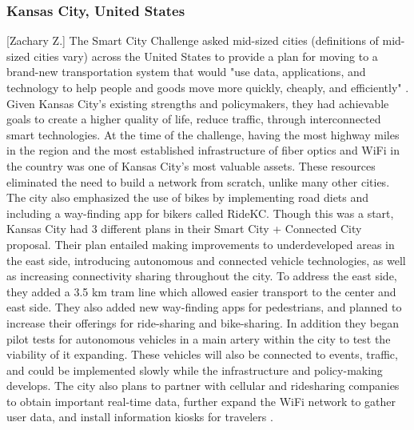 \documentclass[12pt]{article}                               %
\begin{document}
\subsubsection{Kansas City, United States}[Zachary Z.]
The Smart City Challenge asked mid-sized cities (definitions of mid-sized cities vary) across the United States to provide a plan for moving to a brand-new transportation system that would "use data, applications, and technology to help people and goods move more quickly, cheaply, and efficiently" \cite{CityofDenver2016}. Given Kansas City's existing strengths and policymakers, they had achievable goals to create a higher quality of life, reduce traffic, through interconnected smart technologies. At the time of the challenge, having the most highway miles in the region and the most established infrastructure of fiber optics and WiFi in the country was one of Kansas City's most valuable assets. These resources eliminated the need to build a network from scratch, unlike many other cities. The city also emphasized the use of bikes by implementing road diets and including a way-finding app for bikers called RideKC. Though this was a start, Kansas City had 3 different plans in their Smart City + Connected City proposal. Their plan entailed making improvements to underdeveloped areas in the east side, introducing autonomous and connected vehicle technologies, as well as increasing connectivity sharing throughout the city. To address the east side, they added a 3.5 km tram line which allowed easier transport to the center and east side. They also added new way-finding apps for pedestrians, and planned to increase their offerings for ride-sharing and bike-sharing. In addition they began pilot tests for autonomous vehicles in a main artery within the city to test the viability of it expanding. These vehicles will also be connected to events, traffic, and could be implemented slowly while the infrastructure and policy-making develops. The city also plans to partner with cellular and ridesharing companies to obtain important real-time data, further expand the WiFi network to gather user data, and install information kiosks for travelers \cite{CityofDenver2016}.
\end{document}
